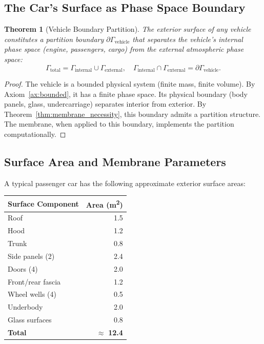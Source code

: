 \documentclass[12pt]{article}
\newtheorem{theorem}{Theorem}[section]
\theoremstyle{definition}
\theoremstyle{remark}
\begin{document}
\subsection{The Car's Surface as Phase Space Boundary}

\begin{theorem}[Vehicle Boundary Partition]
\label{thm:vehicle_boundary}
The exterior surface of any vehicle constitutes a partition boundary $\partial\Gamma_{\mathrm{vehicle}}$ that separates the vehicle's internal phase space (engine, passengers, cargo) from the external atmospheric phase space:
\begin{equation}
  \Gamma_{\mathrm{total}} = \Gamma_{\mathrm{internal}} \cup \Gamma_{\mathrm{external}}, \quad \Gamma_{\mathrm{internal}} \cap \Gamma_{\mathrm{external}} = \partial\Gamma_{\mathrm{vehicle}}.
  \label{eq:vehicle_partition}
\end{equation}
\end{theorem}

\begin{proof}
The vehicle is a bounded physical system (finite mass, finite volume). By Axiom~\ref{ax:bounded}, it has a finite phase space. Its physical boundary (body panels, glass, undercarriage) separates interior from exterior. By Theorem~\ref{thm:membrane_necessity}, this boundary admits a partition structure. The membrane, when applied to this boundary, implements the partition computationally.
\end{proof}

\subsection{Surface Area and Membrane Parameters}

A typical passenger car has the following approximate exterior surface areas:

\begin{center}
\begin{tabular}{@{}lr@{}}
\toprule
\textbf{Surface Component} & \textbf{Area (\si{m^2})} \\
\midrule
Roof & 1.5 \\
Hood & 1.2 \\
Trunk & 0.8 \\
Side panels (2) & 2.4 \\
Doors (4) & 2.0 \\
Front/rear fascia & 1.2 \\
Wheel wells (4) & 0.5 \\
Underbody & 2.0 \\
Glass surfaces & 0.8 \\
\midrule
\textbf{Total} & $\approx$ \textbf{12.4} \\
\bottomrule
\end{tabular}
\end{center}
\end{document}

